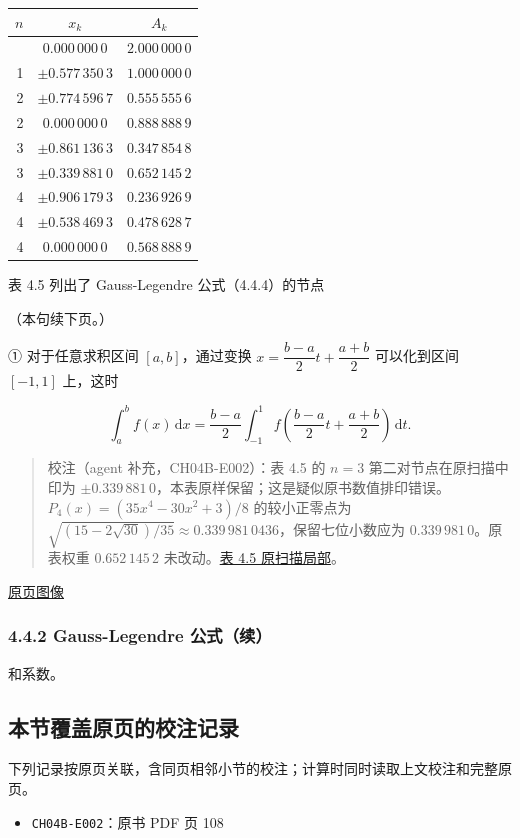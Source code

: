 \documentclass[
  10pt,
  fontset=fandol]{ctexart}
\newcounter{none} %
\providecommand{\tightlist}{%
  \setlength{\itemsep}{0pt}\setlength{\parskip}{0pt}}
\begin{document}
{\def\LTcaptype{none} %
\begin{longtable}[]{@{}rcc@{}}
\toprule\noalign{}
\(n\) & \(x_k\) & \(A_k\) \\
\midrule\noalign{}
\endhead
\bottomrule\noalign{}
\endlastfoot
0 & \(0.000\,000\,0\) & \(2.000\,000\,0\) \\
1 & \(\pm0.577\,350\,3\) & \(1.000\,000\,0\) \\
2 & \(\pm0.774\,596\,7\) & \(0.555\,555\,6\) \\
2 & \(0.000\,000\,0\) & \(0.888\,888\,9\) \\
3 & \(\pm0.861\,136\,3\) & \(0.347\,854\,8\) \\
3 & \(\pm0.339\,881\,0\) & \(0.652\,145\,2\) \\
4 & \(\pm0.906\,179\,3\) & \(0.236\,926\,9\) \\
4 & \(\pm0.538\,469\,3\) & \(0.478\,628\,7\) \\
4 & \(0.000\,000\,0\) & \(0.568\,888\,9\) \\
\end{longtable}
}

表 4.5 列出了 Gauss-Legendre 公式（4.4.4）的节点

（本句续下页。）

① 对于任意求积区间 \([a,b]\)，通过变换 \(x=\dfrac{b-a}{2}t+\dfrac{a+b}{2}\) 可以化到区间 \([-1,1]\) 上，这时

\[
\int_a^b f(x)\,\mathrm{d}x
=\frac{b-a}{2}\int_{-1}^{1}f\left(\frac{b-a}{2}t+\frac{a+b}{2}\right)\,\mathrm{d}t.
\]

\begin{quote}
校注（agent 补充，CH04B-E002）：表 4.5 的 \(n=3\) 第二对节点在原扫描中印为 \(\pm0.339\,881\,0\)，本表原样保留；这是疑似原书数值排印错误。\(P_4(x)=(35x^4-30x^2+3)/8\) 的较小正零点为 \(\sqrt{(15-2\sqrt{30})/35}\approx0.339\,981\,0436\)，保留七位小数应为 \(0.339\,981\,0\)。原表权重 \(0.652\,145\,2\) 未改动。\href{../assets/ch04b/review-table-4-5.png}{表 4.5 原扫描局部}。
\end{quote}

\href{../../source-images/pdf-109.jpeg}{原页图像}

\subsubsection{4.4.2 Gauss-Legendre 公式（续）}\label{gauss-legendre-ux516cux5f0fux7eed}

和系数。

\subsection{本节覆盖原页的校注记录}\label{ux672cux8282ux8986ux76d6ux539fux9875ux7684ux6821ux6ce8ux8bb0ux5f55}

下列记录按原页关联，含同页相邻小节的校注；计算时同时读取上文校注和完整原页。

\begin{itemize}
\tightlist
\item
  \texttt{CH04B-E002}：原书 PDF 页 108
\end{itemize}
\end{document}
